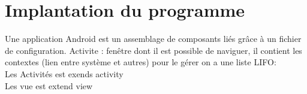 \chapter{Implantation du programme}
	\minitoc
	\newpage
Une application Android est un assemblage de composants liés grâce à un fichier de configuration.
Activite : fenêtre dont il est possible de naviguer, il contient les contextes (lien entre système et autres) pour le gérer on a une liste LIFO:\\
 Les Activités est exends activity \\
Les vue est extend view\\

